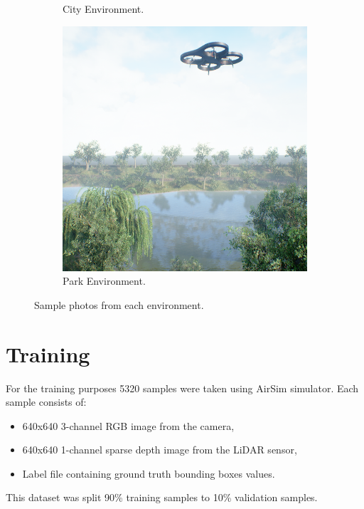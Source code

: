\documentclass[twoside]{ctuthesis}
\theoremstyle{plain}
\theoremstyle{definition}
\theoremstyle{note}
\begin{document}
\begin{figure}
\begin{subfigure}[b]{0.3\textwidth}
		\caption{City Environment.}
	\end{subfigure}
	\hfill
	\begin{subfigure}[b]{0.3\textwidth}
		\centering
		\includegraphics[width=\textwidth]{park_rgb.png}
		\caption{Park Environment.}
	\end{subfigure}
	\caption{Sample photos from each environment.}
\end{figure}
\chapter{Training}
For the training purposes 5320 samples were taken using AirSim simulator. Each sample consists of:
\begin{itemize}
	\item 640x640 3-channel RGB image from the camera,
	\item 640x640 1-channel sparse depth image from the LiDAR sensor,
	\item Label file containing ground truth bounding boxes values.
\end{itemize}
This dataset was split 90\% training samples to 10\% validation samples. 
\end{document}
